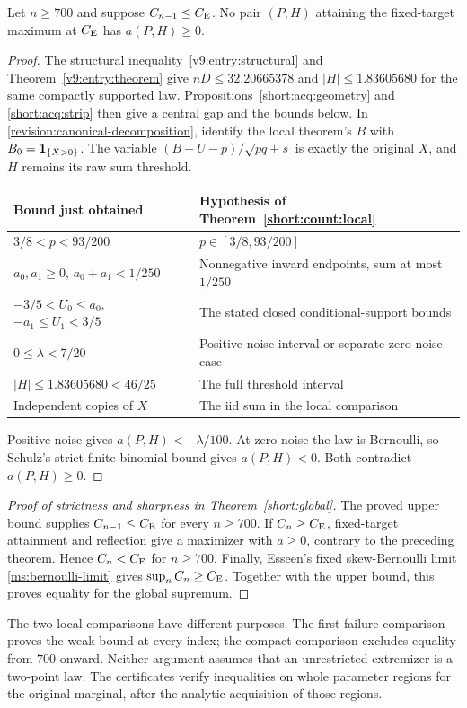 \begin{theorem}
\label{short:acquired-exclusion}
Let $n\ge700$ and suppose $C_{n-1}\le C_{\mathrm E}$. No pair $(P,H)$
attaining the fixed-target maximum at $C_{\mathrm E}$ has $a(P,H)\ge0$.
\end{theorem}
\begin{proof}
The structural inequality~\eqref{v9:entry:structural} and
Theorem~\ref{v9:entry:theorem} give $nD\le32.20665378$ and
$|H|\le1.83605680$ for the same compactly supported law.
Propositions~\ref{short:acq:geometry} and \ref{short:acq:strip}
then give a central gap and the bounds below. In
\eqref{revision:canonical-decomposition}, identify the local theorem's
$B$ with $B_0=\mathbf 1_{\{X>0\}}$. The variable
$(B+U-p)/\sqrt{pq+s}$ is exactly the original $X$, and $H$ remains
its raw sum threshold.
\begin{center}\small
\begin{tabular}{@{}P{.49\linewidth}P{.44\linewidth}@{}}
\toprule
Bound just obtained & Hypothesis of Theorem~\ref{short:count:local} \\
\midrule
$3/8<p<93/200$ & $p\in[3/8,93/200]$ \\
$a_0,a_1\ge0$, $a_0+a_1<1/250$ & Nonnegative inward endpoints, sum at most $1/250$ \\
$-3/5<U_0\le a_0$, $-a_1\le U_1<3/5$ & The stated closed conditional-support bounds \\
$0\le\lambda<7/20$ & Positive-noise interval or separate zero-noise case \\
$|H|\le1.83605680<46/25$ & The full threshold interval \\
Independent copies of $X$ & The iid sum in the local comparison \\
\bottomrule
\end{tabular}
\end{center}
Positive noise gives $a(P,H)<-\lambda/100$. At zero noise the law
is Bernoulli, so Schulz's strict finite-binomial bound gives
$a(P,H)<0$. Both contradict $a(P,H)\ge0$.
\end{proof}

\begin{proof}[Proof of strictness and sharpness in Theorem~\ref{short:global}]
The proved upper bound supplies $C_{n-1}\le C_{\mathrm E}$ for every $n\ge700$.
If $C_n\ge C_{\mathrm E}$, fixed-target attainment and reflection give a
maximizer with $a\ge0$, contrary to the preceding theorem.
Hence $C_n<C_{\mathrm E}$ for $n\ge700$.
Finally, Esseen's fixed skew-Bernoulli limit
\eqref{ms:bernoulli-limit} gives $\sup_n C_n\ge C_{\mathrm E}$.
Together with the upper bound, this proves equality for the global
supremum.
\end{proof}

The two local comparisons have different purposes. The first-failure
comparison proves the weak bound at every index; the compact comparison
excludes equality from $700$ onward. Neither argument assumes that
an unrestricted extremizer is a two-point law. The certificates verify
inequalities on whole parameter regions for the original marginal,
after the analytic acquisition of those regions.
